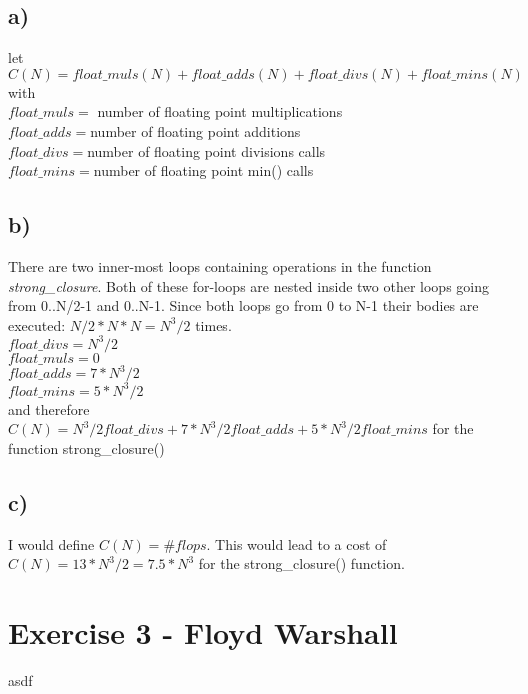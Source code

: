 \documentclass[10pt,a4paper,oneside]{report}
\begin{document}
\subsection*{a)}
let $C(N) = float\_muls(N) + float\_adds (N) + float\_divs(N) + float\_mins(N)$ with \\
$float\_muls = $ number of floating point multiplications \\
$float\_adds = $number of floating point additions \\
$float\_divs = $number of floating point divisions calls \\
$float\_mins = $number of floating point min() calls \\

\subsection*{b)}
There are two inner-most loops containing operations in the function \textit{strong\_closure}. Both of these for-loops are nested inside two other loops going from 0..N/2-1 and 0..N-1. Since both loops go from 0 to N-1 their bodies are executed: $N/2 * N * N = N^3/2$ times.
\\
$float\_divs = N^3/2$ \\
$float\_muls = 0$ \\
$float\_adds = 7*N^3/2$ \\
$float\_mins = 5*N^3/2$\\
and therefore $C(N) = N^3/2 float\_divs + 7*N^3/2 float\_adds + 5*N^3/2 float\_mins$ for the function strong\_closure()

\subsection*{c)}
I would define $C(N) = {\#flops}$. This would lead to a cost of $C(N) = 13*N^3/2 = 7.5*N^3$ for the strong\_closure() function.

\section*{Exercise 3 - Floyd Warshall}
asdf
\end{document}

